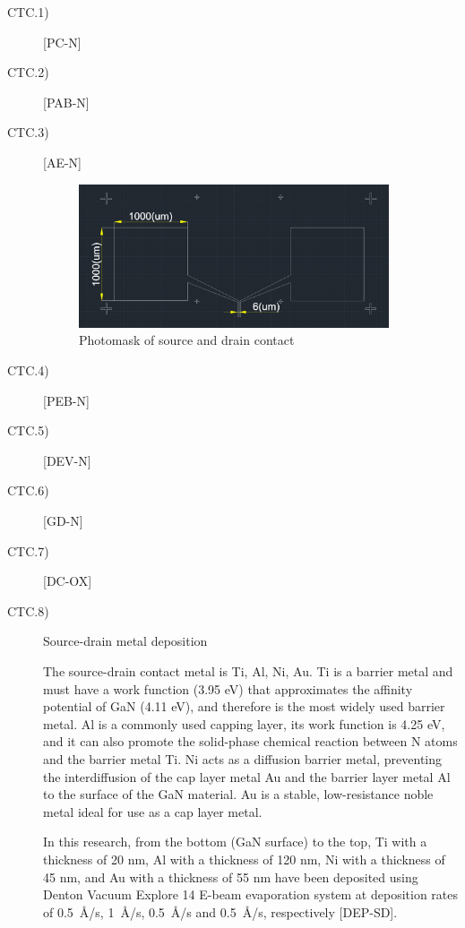 \begin{description}

	\item[CTC.1)] [PC-N]
	\item[CTC.2)] [PAB-N]
	\item[CTC.3)] [AE-N]
	
\begin{figure}[H] 
\centering    
\includegraphics[width=0.9\textwidth]{source}
\caption[Photomask of source and drain contact]{Photomask  of source and drain contact}
\label{fig:source}
\end{figure}

	\item[CTC.4)] [PEB-N]
	
	\item[CTC.5)] [DEV-N]
	
	\item[CTC.6)] [GD-N]
	
	\item[CTC.7)] [DC-OX]
	
	\item[CTC.8)] Source-drain metal deposition
	
	The  source-drain  contact metal is Ti, Al, Ni, Au. Ti is a barrier metal and must have a work function (3.95 \unit{\eV}) that approximates the affinity potential of GaN (4.11 \unit{\eV}), and therefore is the most widely used barrier metal. Al is a commonly used capping layer, its work function is 4.25 \unit{\eV}, and it can also promote the solid-phase chemical reaction between N atoms and the barrier metal Ti. Ni acts as a diffusion barrier metal, preventing the interdiffusion of the cap layer metal Au and the barrier layer metal Al to the surface  of the GaN material. Au is a stable, low-resistance noble metal ideal for use as a cap layer metal.
	
	In this research, from the bottom (GaN surface) to the top, Ti with a thickness of 20 \unit{\nm}, Al with a thickness of 120 \unit{\nm}, Ni with a thickness of 45 \unit{\nm}, and Au with a thickness of 55 \unit{\nm} have been deposited using Denton Vacuum Explore 14 E-beam evaporation system at deposition rates of \SI{0.5}{\angstrom}/s, \SI{1}{\angstrom}/s, \SI{0.5}{\angstrom}/s and \SI{0.5}{\angstrom}/s, respectively [DEP-SD].
	

\end{description}
